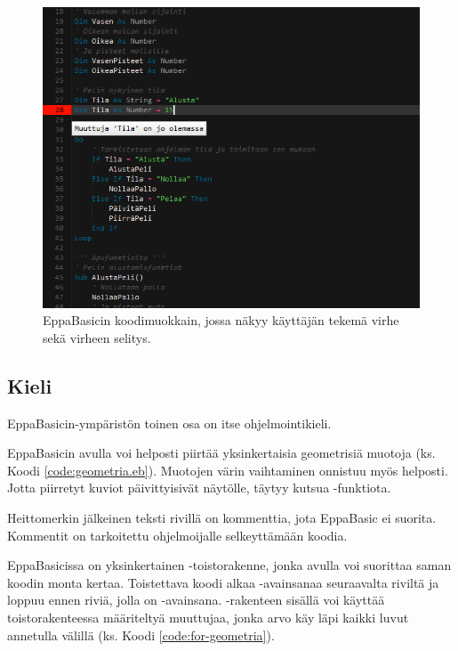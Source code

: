 \begin{figure}[h]
    \centering
    \includegraphics[width=1\textwidth]{virhe}
    \caption{EppaBasicin koodimuokkain, jossa näkyy käyttäjän tekemä virhe sekä virheen selitys.}
    \label{img:virhe}
\end{figure}

\subsection{Kieli}
EppaBasicin-ympäristön toinen osa on
itse ohjelmointikieli.

EppaBasicin avulla voi helposti
piirtää yksinkertaisia geometrisiä
muotoja (ks. Koodi \ref{code:geometria.eb}).
Muotojen värin vaihtaminen
onnistuu myös helposti.
Jotta piirretyt kuviot
päivittyisivät näytölle,
täytyy kutsua
-funktiota.

Heittomerkin  jälkeinen
teksti rivillä on kommenttia,
jota EppaBasic ei suorita.
Kommentit on tarkoitettu
ohjelmoijalle selkeyttämään
koodia.


EppaBasicissa on yksinkertainen
-toistorakenne, jonka
avulla voi suorittaa saman
koodin monta kertaa.
Toistettava koodi alkaa
-avainsanaa seuraavalta
riviltä ja loppuu ennen riviä,
jolla on -avainsana.
-rakenteen sisällä voi
käyttää toistorakenteessa määriteltyä
muuttujaa, jonka arvo käy läpi
kaikki luvut annetulla välillä
(ks. Koodi \ref{code:for-geometria}).

